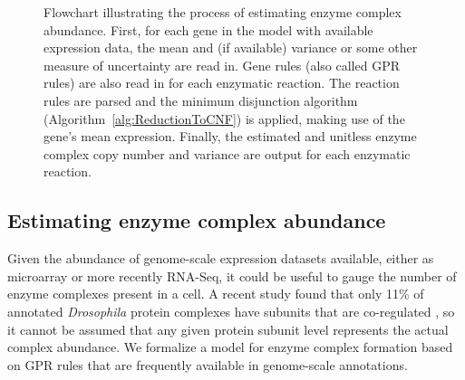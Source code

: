 \vspace{5 mm} 
\begin{figure}
\begin{center}
\end{center}
\caption{Flowchart illustrating the process of estimating enzyme
  complex abundance. First, for each gene in the model with
  available expression data, the mean and (if available) variance or
  some other measure of uncertainty are read in. Gene rules (also
  called GPR rules) are also read in for each enzymatic reaction. The
  reaction rules are parsed and the minimum disjunction algorithm
  (Algorithm~\ref{alg:ReductionToCNF}) is applied, making use of the
  gene's mean expression. Finally, the estimated and unitless enzyme
  complex copy number and variance are output for each enzymatic
  reaction.}
\label{ECCN_flowchart}
\end{figure}

\subsection{Estimating enzyme complex abundance}

Given the abundance of genome-scale expression datasets available,
either as microarray or more recently RNA-Seq, it could be useful to
gauge the number of enzyme complexes present in a cell. A recent
study found that only 11\% of annotated \textit{Drosophila}
protein complexes have subunits that are co-regulated
\citep{Juschke2013}, so it cannot be assumed that any given protein
subunit level represents the actual complex abundance. We formalize a
model for enzyme complex formation based on GPR rules that are
frequently available in genome-scale annotations.

